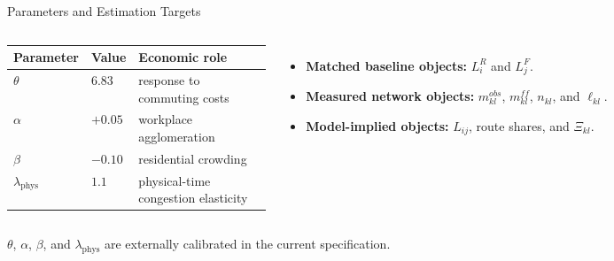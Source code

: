 \documentclass[11pt,aspectratio=169]{beamer}
\newcommand{\app}[1]{\allowbreak\hspace{0.25em}\hyperlink{#1}{\beamergotobutton{details}}}
\begin{document}
\begin{frame}[label=estparams]{Parameters and Estimation Targets}
\small
\begin{columns}[T,onlytextwidth]
\scriptsize
\begin{tabularx}{\linewidth}{@{}p{0.18\linewidth}p{0.16\linewidth}X@{}}
\toprule
Parameter & Value & Economic role \\
\midrule
$\theta$ & $6.83$ & response to commuting costs \\
$\alpha$ & $+0.05$ & workplace agglomeration \\
$\beta$ & $-0.10$ & residential crowding \\
$\lambda_{\mathrm{phys}}$ & $1.1$ & physical-time congestion elasticity \\
\bottomrule
\end{tabularx}
\begin{itemize}\footnotesize
  \item \textbf{Matched baseline objects:} $L_i^R$ and $L_j^F$.
  \item \textbf{Measured network objects:} $m_{kl}^{obs}$, $m_{kl}^{ff}$, $n_{kl}$, and $\ell_{kl}$.
  \item \textbf{Model-implied objects:} $L_{ij}$, route shares, and $\Xi_{kl}$.
\end{itemize}
\end{columns}
\vspace{0.45em}
{\footnotesize $\theta$, $\alpha$, $\beta$, and $\lambda_{\mathrm{phys}}$ are externally calibrated in the current specification. \app{appparams}}
\end{frame}
\end{document}
